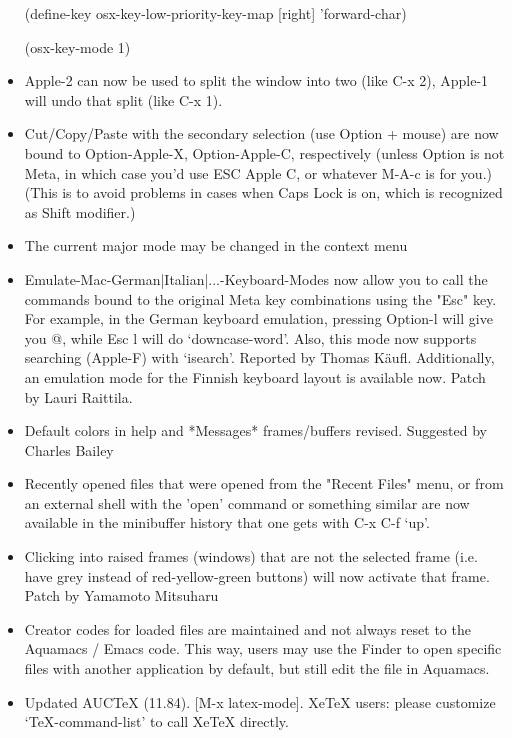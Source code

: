 \begin{itemize}
(define-key osx-key-low-priority-key-map [right] 'forward-char)

(osx-key-mode 1)

\item Apple-2 can now be used to split the window into two (like C-x
	2), Apple-1 will undo that split (like C-x 1).

\item Cut/Copy/Paste with the secondary selection (use Option + mouse)
	are now bound to Option-Apple-X, Option-Apple-C,
	respectively (unless Option is not Meta, in which case you'd use
	ESC Apple C, or whatever M-A-c is for you.)  (This is to avoid
	problems in cases when Caps Lock is on, which is recognized as
	Shift modifier.)

\item The current major mode may be changed in the context menu

\item Emulate-Mac-German|Italian|...-Keyboard-Modes now allow you to
	call the commands bound to the original Meta key combinations
	using the "Esc" key. For example, in the German keyboard
	emulation, pressing Option-l will give you @, while Esc l will do
	`downcase-word'.
	Also, this mode now supports searching (Apple-F) with `isearch'.
	Reported by Thomas Käufl.	Additionally, an emulation mode for the Finnish keyboard layout is available now. Patch by Lauri Raittila.


\item Default colors in help and *Messages* frames/buffers revised.
	Suggested by Charles Bailey

\item Recently opened files that were opened from the "Recent Files"
	menu, or from an external shell with the 'open' command or
	something similar are now available in the minibuffer history that
	one gets with C-x C-f `up'.
	
\item Clicking into raised frames (windows) that are not the selected
	frame (i.e. have grey instead of red-yellow-green buttons) will
	now activate that frame.
	Patch by Yamamoto Mitsuharu

\item Creator codes for loaded files are maintained and not always
	reset to the Aquamacs / Emacs code. This way, users may use the
	Finder to open specific files with another application by default,
	but still edit the file in Aquamacs.

\item Updated AUCTeX (11.84). [M-x latex-mode].
	XeTeX users: please customize `TeX-command-list' to call XeTeX
	directly.
	

\end{itemize}
